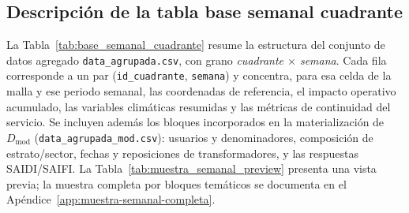 \subsection{Descripción de la tabla base semanal cuadrante}
    La Tabla~\ref{tab:base_semanal_cuadrante} resume la estructura del conjunto de datos agregado \texttt{data\_agrupada.csv}, con grano \textit{cuadrante $\times$ semana}. Cada fila corresponde a un par (\texttt{id\_cuadrante}, \texttt{semana}) y concentra, para esa celda de la malla y ese periodo semanal, las coordenadas de referencia, el impacto operativo acumulado, las variables climáticas resumidas y las métricas de continuidad del servicio. Se incluyen además los bloques incorporados en la materialización de $D_{\mathrm{mod}}$ (\texttt{data\_agrupada\_mod.csv}): usuarios y denominadores, composición de estrato/sector, fechas y reposiciones de transformadores, y las respuestas SAIDI/SAIFI. La Tabla~\ref{tab:muestra_semanal_preview} presenta una vista previa; la muestra completa por bloques temáticos se documenta en el Apéndice~\ref{app:muestra-semanal-completa}.
    
